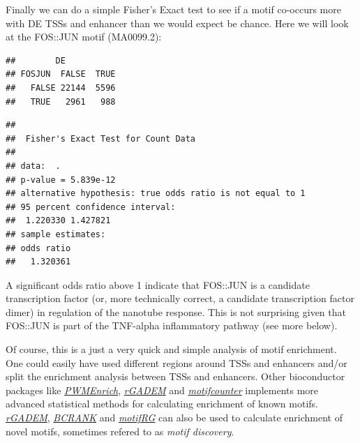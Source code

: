 \documentclass[9pt,a4paper,]{extarticle}
\newenvironment{Shaded}{\begin{snugshade}}{\end{snugshade}}
\newcommand{\KeywordTok}[1]{\textcolor[rgb]{0.13,0.29,0.53}{\textbf{{#1}}}}
\newcommand{\DataTypeTok}[1]{\textcolor[rgb]{0.13,0.29,0.53}{{#1}}}
\newcommand{\FloatTok}[1]{\textcolor[rgb]{0.00,0.00,0.81}{{#1}}}
\newcommand{\StringTok}[1]{\textcolor[rgb]{0.31,0.60,0.02}{{#1}}}
\newcommand{\CommentTok}[1]{\textcolor[rgb]{0.56,0.35,0.01}{\textit{{#1}}}}
\newcommand{\NormalTok}[1]{{#1}}
\begin{document}
Finally we can do a simple Fisher's Exact test to see if a motif co-occurs more with DE TSSs and enhancer than we would expect be chance. Here we will look at the FOS::JUN motif (MA0099.2):

\begin{Shaded}
\end{Shaded}

\begin{verbatim}
##        DE
## FOSJUN  FALSE  TRUE
##   FALSE 22144  5596
##   TRUE   2961   988
\end{verbatim}

\begin{verbatim}
## 
##  Fisher's Exact Test for Count Data
## 
## data:  .
## p-value = 5.839e-12
## alternative hypothesis: true odds ratio is not equal to 1
## 95 percent confidence interval:
##  1.220330 1.427821
## sample estimates:
## odds ratio 
##   1.320361
\end{verbatim}

A significant odds ratio above 1 indicate that FOS::JUN is a candidate transcription factor (or, more technically correct, a candidate transcription factor dimer) in regulation of the nanotube response. This is not surprising given that FOS::JUN is part of the TNF-alpha inflammatory pathway (see more below).

Of course, this is a just a very quick and simple analysis of motif enrichment. One could easily have used different regions around TSSs and enhancers and/or split the enrichment analysis between TSSs and enhancers. Other bioconductor packages like \emph{\href{https://bioconductor.org/packages/3.8/PWMEnrich}{PWMEnrich}}, \emph{\href{https://bioconductor.org/packages/3.8/rGADEM}{rGADEM}} and \emph{\href{https://bioconductor.org/packages/3.8/motifcounter}{motifcounter}} implements more advanced statistical methods for calculating enrichment of known motifs. \emph{\href{https://bioconductor.org/packages/3.8/rGADEM}{rGADEM}}, \emph{\href{https://bioconductor.org/packages/3.8/BCRANK}{BCRANK}} and \emph{\href{https://bioconductor.org/packages/3.8/motifRG}{motifRG}} can also be used to calculate enrichment of novel motifs, sometimes refered to as \emph{motif discovery}.
\end{document}
